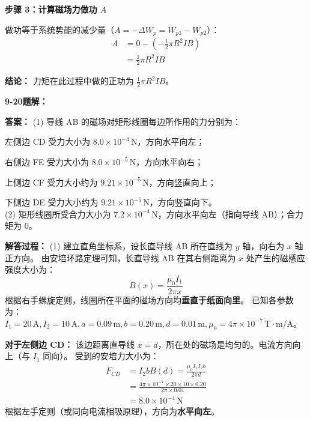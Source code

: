 \textbf{步骤 3：计算磁场力做功 $A$}

做功等于系统势能的减少量（$A = -\Delta W_p = W_{p1} - W_{p2}$）：
\begin{align*}
	A &= 0 - \left( -\frac{1}{2}\pi R^2 I B \right) \\
	&= \frac{1}{2}\pi R^2 I B
\end{align*}

\textbf{结论：}
力矩在此过程中做的正功为 $\frac{1}{2}\pi R^2 I B$。

\vspace{1em}

\textbf{9-20题解： }
\setcounter{equation}{0}
\renewcommand{\theHequation}{9-20.\arabic{equation}}

\textbf{答案： }
(1) 导线 AB 的磁场对矩形线圈每边所作用的力分别为：

左侧边 CD 受力大小为 $8.0 \times 10^{-4}\,\text{N}$，方向水平向左；

右侧边 FE 受力大小为 $8.0 \times 10^{-5}\,\text{N}$，方向水平向右；

上侧边 CF 受力大小约为 $9.21 \times 10^{-5}\,\text{N}$，方向竖直向上；

下侧边 DE 受力大小约为 $9.21 \times 10^{-5}\,\text{N}$，方向竖直向下。\\
(2) 矩形线圈所受合力大小为 $7.2 \times 10^{-4}\,\text{N}$，方向水平向左（指向导线 AB）；合力矩为 $0$。

\textbf{解答过程： }
(1) 建立直角坐标系，设长直导线 AB 所在直线为 $y$ 轴，向右为 $x$ 轴正方向。
由安培环路定理可知，长直导线 AB 在其右侧距离为 $x$ 处产生的磁感应强度大小为：
\begin{equation}\label{eq:9-20-1}
	B(x) = \frac{\mu_0 I_1}{2\pi x}
\end{equation}
根据右手螺旋定则，线圈所在平面的磁场方向均\textbf{垂直于纸面向里}。
已知各参数为：$I_1 = 20\,\text{A}, I_2 = 10\,\text{A}, a = 0.09\,\text{m}, b = 0.20\,\text{m}, d = 0.01\,\text{m}, \mu_0 = 4\pi \times 10^{-7}\,\text{T}\cdot\text{m/A}$。

\textbf{对于左侧边 CD：}
该边距离直导线 $x = d$，所在处的磁场是均匀的。电流方向向上（与 $I_1$ 同向）。
受到的安培力大小为：
\begin{align*}
	F_{CD} &= I_2 b B(d) = \frac{\mu_0 I_1 I_2 b}{2\pi d} \\
	&= \frac{4\pi \times 10^{-7} \times 20 \times 10 \times 0.20}{2\pi \times 0.01} \\
	&= 8.0 \times 10^{-4}\,\text{N}
\end{align*}
根据左手定则（或同向电流相吸原理），方向为\textbf{水平向左}。

